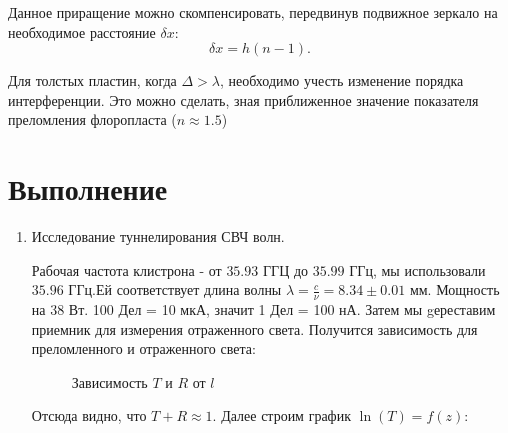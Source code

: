 \documentclass[a4paper,12pt]{article}
\theoremstyle{plain} %
\theoremstyle{definition} %
\theoremstyle{remark} %
\begin{document}
Данное приращение можно скомпенсировать, передвинув подвижное зеркало на необходимое расстояние $\delta{}x:$ \[\delta{}x = h(n-1).\]

Для толстых пластин, когда $\Delta > \lambda$, необходимо учесть изменение порядка интерференции. Это можно сделать, зная приближенное значение показателя преломления флоропласта ($n \approx 1.5$)

\section{Выполнение}
\begin{enumerate}
\item Исследование туннелирования СВЧ волн.

Рабочая частота клистрона - от $35.93$ ГГЦ до  $35.99$ ГГц, мы использовали $35.96$ ГГц.Ей соответствует длина волны $\lambda = \frac{c}{\nu} = 8.34 \pm 0.01$ мм. Мощность на 38 Вт. 100 Дел = 10 мкА, значит 1 Дел = 100 нА. Затем мы gереставим приемник для измерения отраженного света. Получится зависимость для преломленного и отраженного света:

\begin{figure}[h!]
	\caption{Зависимость $T$ и $R$ от $l$}
\end{figure}

Отсюда видно, что $T+R \approx 1$. Далее строим график $\ln(T) = f(z)$:


\end{enumerate}
\end{document}
